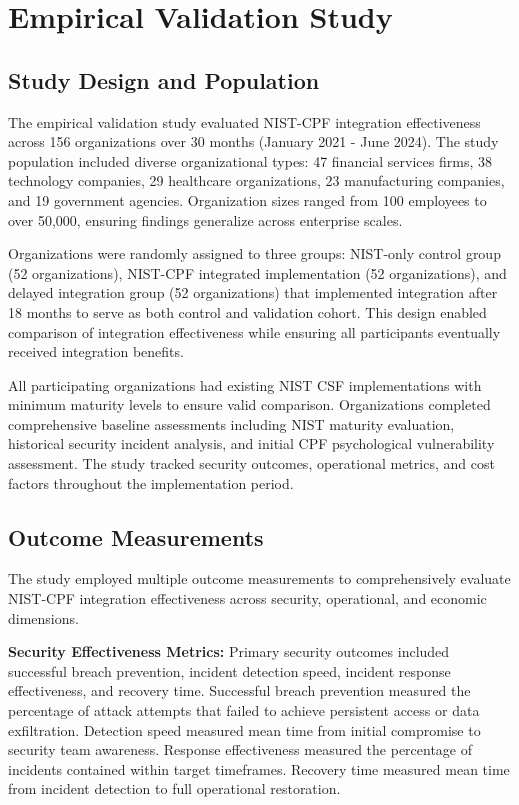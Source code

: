 \documentclass[10pt, twocolumn]{article}
\begin{document}
\section{Empirical Validation Study}

\subsection{Study Design and Population}

The empirical validation study evaluated NIST-CPF integration effectiveness across 156 organizations over 30 months (January 2021 - June 2024). The study population included diverse organizational types: 47 financial services firms, 38 technology companies, 29 healthcare organizations, 23 manufacturing companies, and 19 government agencies. Organization sizes ranged from 100 employees to over 50,000, ensuring findings generalize across enterprise scales.

Organizations were randomly assigned to three groups: NIST-only control group (52 organizations), NIST-CPF integrated implementation (52 organizations), and delayed integration group (52 organizations) that implemented integration after 18 months to serve as both control and validation cohort. This design enabled comparison of integration effectiveness while ensuring all participants eventually received integration benefits.

All participating organizations had existing NIST CSF implementations with minimum maturity levels to ensure valid comparison. Organizations completed comprehensive baseline assessments including NIST maturity evaluation, historical security incident analysis, and initial CPF psychological vulnerability assessment. The study tracked security outcomes, operational metrics, and cost factors throughout the implementation period.

\subsection{Outcome Measurements}

The study employed multiple outcome measurements to comprehensively evaluate NIST-CPF integration effectiveness across security, operational, and economic dimensions.

\textbf{Security Effectiveness Metrics:} Primary security outcomes included successful breach prevention, incident detection speed, incident response effectiveness, and recovery time. Successful breach prevention measured the percentage of attack attempts that failed to achieve persistent access or data exfiltration. Detection speed measured mean time from initial compromise to security team awareness. Response effectiveness measured the percentage of incidents contained within target timeframes. Recovery time measured mean time from incident detection to full operational restoration.
\end{document}
